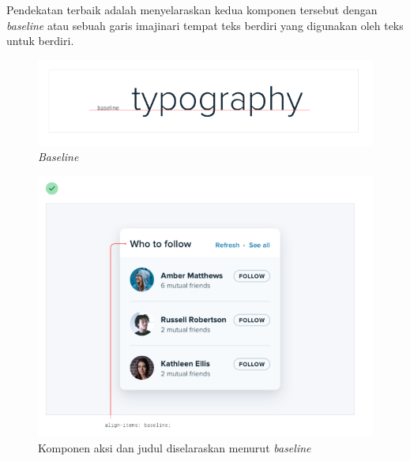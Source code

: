Pendekatan terbaik adalah menyelaraskan kedua komponen tersebut dengan \textit{baseline} atau sebuah garis imajinari tempat teks berdiri yang digunakan oleh teks untuk berdiri.
\begin{figure}[H]
	{\centering
		\includegraphics[keepaspectratio, width=12cm]{gambar/refactoring-ui-g18.png}
		\caption{\textit{Baseline} \citep{refactoringui}}}
	\label{gambar:refactoring-ui-g18.png}
\end{figure}
\begin{figure}[H]
	{\centering
		\includegraphics[keepaspectratio, width=12cm]{gambar/refactoring-ui-g19.png}
		\caption{Komponen aksi dan judul diselaraskan menurut \textit{baseline} \citep{refactoringui}}}
	\label{gambar:refactoring-ui-g19.png}
\end{figure}

